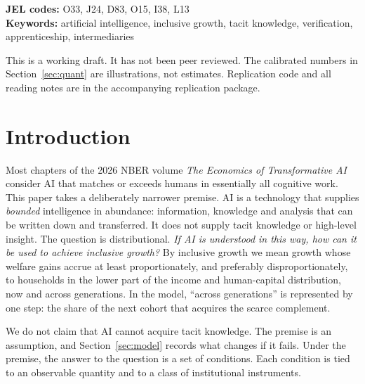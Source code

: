\documentclass[12pt]{article}
\theoremstyle{remark}
\begin{document}
\begin{titlepage}
\noindent\textbf{JEL codes:} O33, J24, D83, O15, I38, L13\\
\textbf{Keywords:} artificial intelligence, inclusive growth, tacit knowledge, verification, apprenticeship, intermediaries

\vfill
\noindent\small This is a working draft. It has not been peer reviewed. The calibrated numbers in Section~\ref{sec:quant} are illustrations, not estimates. Replication code and all reading notes are in the accompanying replication package.
\end{titlepage}

\section{Introduction}\label{sec:intro}

Most chapters of the 2026 NBER volume \emph{The Economics of Transformative AI} \citep{agrawal2026volume} consider AI that matches or exceeds humans in essentially all cognitive work. This paper takes a deliberately narrower premise. AI is a technology that supplies \emph{bounded} intelligence in abundance: information, knowledge and analysis that can be written down and transferred. It does not supply tacit knowledge or high-level insight. The question is distributional. \emph{If AI is understood in this way, how can it be used to achieve inclusive growth?} By inclusive growth we mean growth whose welfare gains accrue at least proportionately, and preferably disproportionately, to households in the lower part of the income and human-capital distribution, now and across generations. In the model, ``across generations'' is represented by one step: the share of the next cohort that acquires the scarce complement.

We do not claim that AI cannot acquire tacit knowledge. The premise is an assumption, and Section~\ref{sec:model} records what changes if it fails. Under the premise, the answer to the question is a set of conditions. Each condition is tied to an observable quantity and to a class of institutional instruments.
\end{document}
